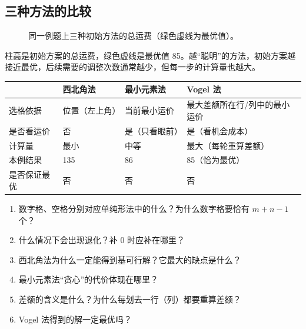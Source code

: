 \subsection{三种方法的比较}
\begin{figure}[H]
\centering
{}
\caption{同一例题上三种初始方法的总运费（绿色虚线为最优值）。}\label{fig:compare}
\end{figure}
柱高是初始方案的总运费，绿色虚线是最优值 85。越“聪明”的方法，初始方案越接近最优，后续需要的调整次数通常越少，但每一步的计算量也越大。
\begin{center}\small
\begin{tabularx}{\linewidth}{@{}l X X X@{}}
\toprule
 & 西北角法 & 最小元素法 & Vogel 法\\
\midrule
选格依据 & 位置（左上角） & 当前最小运价 & 最大差额所在行/列中的最小运价\\
是否看运价 & 否 & 是（只看眼前） & 是（看机会成本）\\
计算量 & 最小 & 中等 & 最大（每轮重算差额）\\
本例结果 & 135 & 86 & 85（恰为最优）\\
是否保证最优 & 否 & 否 & 否\\
\bottomrule
\end{tabularx}
\end{center}

\begin{checkbox}
\begin{enumerate}[label=\arabic*.]
\item 数字格、空格分别对应单纯形法中的什么？为什么数字格要恰有 $m+n-1$ 个？
\item 什么情况下会出现退化？补 0 时应补在哪里？
\item 西北角法为什么一定能得到基可行解？它最大的缺点是什么？
\item 最小元素法“贪心”的代价体现在哪里？
\item 差额的含义是什么？为什么每划去一行（列）都要重算差额？
\item Vogel 法得到的解一定最优吗？
\end{enumerate}
\end{checkbox}

